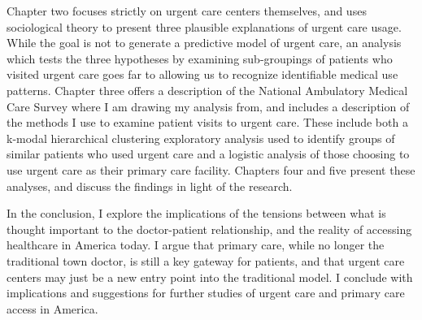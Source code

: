 \documentclass[12pt,twoside]{reedthesis}
\begin{document}
  Chapter two focuses strictly on urgent care centers themselves, and uses
  sociological theory to present three plausible explanations of urgent
  care usage. While the goal is not to generate a predictive model of
  urgent care, an analysis which tests the three hypotheses by examining
  sub-groupings of patients who visited urgent care goes far to allowing
  us to recognize identifiable medical use patterns. Chapter three offers
  a description of the National Ambulatory Medical Care Survey where I am
  drawing my analysis from, and includes a description of the methods I
  use to examine patient visits to urgent care. These include both a
  k-modal hierarchical clustering exploratory analysis used to identify
  groups of similar patients who used urgent care and a logistic analysis
  of those choosing to use urgent care as their primary care facility.
  Chapters four and five present these analyses, and discuss the findings
  in light of the research.
  
  In the conclusion, I explore the implications of the tensions between
  what is thought important to the doctor-patient relationship, and the
  reality of accessing healthcare in America today. I argue that primary
  care, while no longer the traditional town doctor, is still a key
  gateway for patients, and that urgent care centers may just be a new
  entry point into the traditional model. I conclude with implications and
  suggestions for further studies of urgent care and primary care access
  in America.
  
  \begin{Shaded}
  \begin{Highlighting}[]
  
  \CommentTok{#}
  \end{Highlighting}
  \end{Shaded}
  
\end{document}
